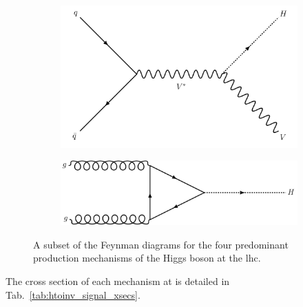 \begin{figure}[htbp]
    \begin{subfigure}[b]{0.45\textwidth}
        \includegraphics[width=\textwidth]{figures/feynman_diagrams/VH.pdf}
        \caption{\VH}
    \end{subfigure}
    \hfill
    \begin{subfigure}[b]{0.45\textwidth}
        \includegraphics[width=\textwidth]{figures/feynman_diagrams/ggF.pdf}
        \caption{\ggH}
    \end{subfigure}
\caption[A subset of the Feynman diagrams for the four predominant production mechanisms of the Higgs boson at the LHC]{A subset of the Feynman diagrams for the four predominant production mechanisms of the Higgs boson at the \acrshort{lhc}.}
\label{fig:higgs_feynman_diagrams}
\end{figure}

The cross section of each mechanism at \comruntwo is detailed in Tab.~\ref{tab:htoinv_signal_xsecs}.


